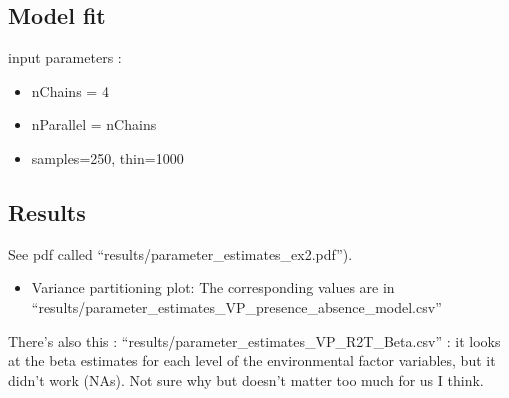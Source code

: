 \documentclass[
]{article}
\newenvironment{Shaded}{\begin{snugshade}}{\end{snugshade}}
\newcommand{\AttributeTok}[1]{\textcolor[rgb]{0.77,0.63,0.00}{#1}}
\newcommand{\FloatTok}[1]{\textcolor[rgb]{0.00,0.00,0.81}{#1}}
\newcommand{\FunctionTok}[1]{\textcolor[rgb]{0.00,0.00,0.00}{#1}}
\newcommand{\NormalTok}[1]{#1}
\newcommand{\OtherTok}[1]{\textcolor[rgb]{0.56,0.35,0.01}{#1}}
\newcommand{\SpecialCharTok}[1]{\textcolor[rgb]{0.00,0.00,0.00}{#1}}
\providecommand{\tightlist}{%
  \setlength{\itemsep}{0pt}\setlength{\parskip}{0pt}}
\begin{document}
\hypertarget{model-fit}{%
\subsection{Model fit}\label{model-fit}}

input parameters :

\begin{itemize}
\item
  nChains = 4
\item
  nParallel = nChains
\item
  samples=250, thin=1000
\end{itemize}

\begin{Shaded}
\end{Shaded}

\hypertarget{results}{%
\subsection{Results}\label{results}}

See pdf called ``results/parameter\_estimates\_ex2.pdf'').

\begin{itemize}
\tightlist
\item
  Variance partitioning plot: The corresponding values are in
  ``results/parameter\_estimates\_VP\_presence\_absence\_model.csv''
\end{itemize}

There's also this : ``results/parameter\_estimates\_VP\_R2T\_Beta.csv''
: it looks at the beta estimates for each level of the environmental
factor variables, but it didn't work (NAs). Not sure why but doesn't
matter too much for us I think.
\end{document}
